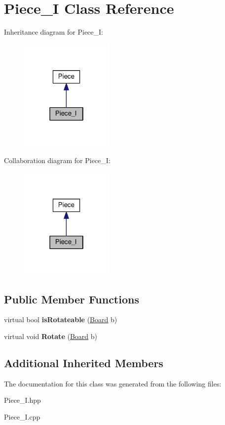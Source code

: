 \hypertarget{class_piece___i}{}\section{Piece\+\_\+I Class Reference}
\label{class_piece___i}


Inheritance diagram for Piece\+\_\+I\+:
\nopagebreak
\begin{figure}[H]
\begin{center}
\leavevmode
\includegraphics[width=130pt]{class_piece___i__inherit__graph}
\end{center}
\end{figure}


Collaboration diagram for Piece\+\_\+I\+:
\nopagebreak
\begin{figure}[H]
\begin{center}
\leavevmode
\includegraphics[width=130pt]{class_piece___i__coll__graph}
\end{center}
\end{figure}
\subsection*{Public Member Functions}
\begin{DoxyCompactItemize}
\item 
\mbox{\label{class_piece___i_aec103ce64d2702bf3dc5dbcdb8b450eb}} 
virtual bool {\bfseries is\+Rotateable} (\hyperlink{class_board}{Board} b)
\item 
\mbox{\label{class_piece___i_ab7983a575f6d5d41cbf846b6240a9b43}} 
virtual void {\bfseries Rotate} (\hyperlink{class_board}{Board} b)
\end{DoxyCompactItemize}
\subsection*{Additional Inherited Members}


The documentation for this class was generated from the following files\+:\begin{DoxyCompactItemize}
\item 
Piece\+\_\+\+I.\+hpp\item 
Piece\+\_\+\+I.\+cpp\end{DoxyCompactItemize}
